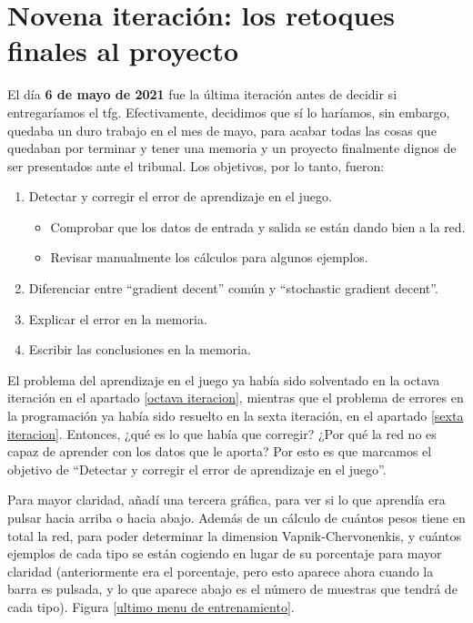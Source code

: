 \section{Novena iteración: los retoques finales al proyecto}
\label{novena iteracion}
El día \textbf{6 de mayo de 2021} fue la última iteración antes de decidir si entregaríamos el \gls{tfg}. Efectivamente, decidimos que sí lo haríamos, sin embargo, quedaba un duro trabajo en el mes de mayo, para acabar todas las cosas que quedaban por terminar y tener una memoria y un proyecto finalmente dignos de ser presentados ante el tribunal. Los objetivos, por lo tanto, fueron:
\begin{enumerate}
	\item Detectar y corregir el error de aprendizaje en el juego.
	\begin{itemize}
		\item Comprobar que los datos de entrada y salida se están dando bien a la red.
		\item Revisar manualmente los cálculos para algunos ejemplos.
	\end{itemize}
	\item Diferenciar entre ``gradient decent'' común y ``stochastic gradient decent''.
	\item Explicar el error en la memoria.
	\item Escribir las conclusiones en la memoria.
\end{enumerate}

El problema del aprendizaje en el juego ya había sido solventado en la octava iteración en el apartado \ref{octava iteracion}, mientras que el problema de errores en la programación ya había sido resuelto en la sexta iteración, en el apartado \ref{sexta iteracion}. Entonces, ¿qué es lo que había que corregir? ¿Por qué la red no es capaz de aprender con los datos que le aporta? Por esto es que marcamos el objetivo de ``Detectar y corregir el error de aprendizaje en el juego''.

Para mayor claridad, añadí una tercera gráfica, para ver si lo que aprendía era pulsar hacia arriba o hacia abajo. Además de un cálculo de cuántos pesos tiene en total la red, para poder determinar la dimension Vapnik-Chervonenkis, y cuántos ejemplos de cada tipo se están cogiendo en lugar de su porcentaje para mayor claridad (anteriormente era el porcentaje, pero esto aparece ahora cuando la barra es pulsada, y lo que aparece abajo es el número de muestras que tendrá de cada tipo). Figura \ref{ultimo menu de entrenamiento}.

